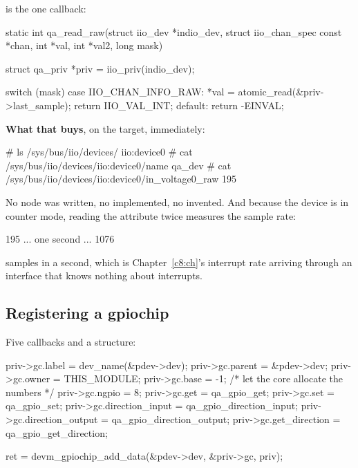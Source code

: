  is the one callback:

\begin{ccode}
static int qa_read_raw(struct iio_dev *indio_dev, struct iio_chan_spec const *chan,
                       int *val, int *val2, long mask)
{
        struct qa_priv *priv = iio_priv(indio_dev);

        switch (mask) {
        case IIO_CHAN_INFO_RAW:
                *val = atomic_read(&priv->last_sample);
                return IIO_VAL_INT;
        default:
                return -EINVAL;
        }
}
\end{ccode}

\noindent \textbf{What that buys}, on the target, immediately:

\begin{console}
# ls /sys/bus/iio/devices/
iio:device0
# cat /sys/bus/iio/devices/iio:device0/name
qa_dev
# cat /sys/bus/iio/devices/iio:device0/in_voltage0_raw
195
\end{console}

\noindent No  node was written, no  implemented, no  invented.
And because the device is in counter mode, reading the attribute twice measures the sample rate:

\begin{console}
195 ... one second ... 1076
\end{console}

 samples in a second, which is Chapter~\ref{c8:ch}'s interrupt rate arriving through an
interface that knows nothing about interrupts.

\subsection{Registering a gpiochip}
\label{c11:app:a5}

Five callbacks and a structure:

\begin{ccode}
priv->gc.label           = dev_name(&pdev->dev);
priv->gc.parent          = &pdev->dev;
priv->gc.owner           = THIS_MODULE;
priv->gc.base            = -1;              /* let the core allocate the numbers */
priv->gc.ngpio           = 8;
priv->gc.get             = qa_gpio_get;
priv->gc.set             = qa_gpio_set;
priv->gc.direction_input = qa_gpio_direction_input;
priv->gc.direction_output = qa_gpio_direction_output;
priv->gc.get_direction   = qa_gpio_get_direction;

ret = devm_gpiochip_add_data(&pdev->dev, &priv->gc, priv);
\end{ccode}


